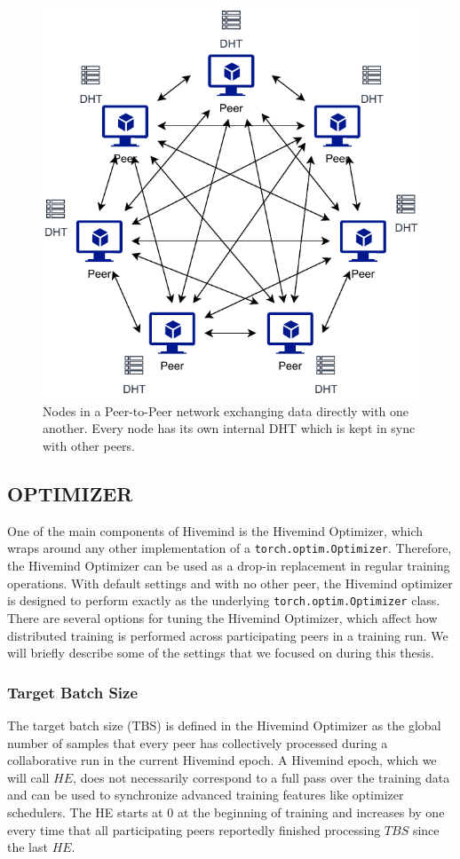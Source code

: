 \begin{figure}[ht]
    \centering
    \caption{Nodes in a Peer-to-Peer network exchanging data directly with one another. Every node has its own internal DHT which is kept in sync with other peers.}
    \label{fig:dht-communication}
    \includegraphics[width=0.5 \textwidth]{./figures/02_dht-communication.pdf}
\end{figure}

\subsection{OPTIMIZER}
One of the main components of Hivemind is the Hivemind Optimizer, which wraps around any other implementation of a \texttt{torch.optim.Optimizer}.
Therefore, the Hivemind Optimizer can be used as a drop-in replacement in regular training operations.
With default settings and with no other peer, the Hivemind optimizer is designed to perform exactly as the underlying \texttt{torch.optim.Optimizer} class.
There are several options for tuning the Hivemind Optimizer, which affect how distributed training is performed across participating peers in a training run.
We will briefly describe some of the settings that we focused on during this thesis.

\subsubsection{Target Batch Size}

The target batch size (TBS) is defined in the Hivemind Optimizer as the global number of samples that every peer has collectively processed during a collaborative run in the current Hivemind epoch.
A Hivemind epoch, which we will call $HE$, does not necessarily correspond to a full pass over the training data and can be used to synchronize advanced training features like optimizer schedulers.
The HE starts at 0 at the beginning of training and increases by one every time that all participating peers reportedly finished processing $TBS$ since the last $HE$.

